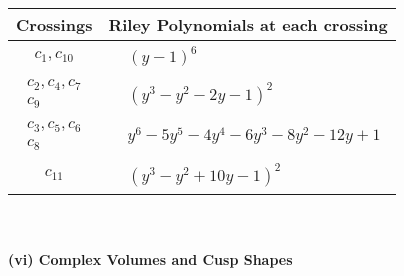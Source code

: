 \documentclass[1p]{elsarticle_modified}
\theoremstyle{definition}
\begin{document}
\begin{tabular}{m{50pt}|m{274pt}}
Crossings & \hspace{64pt}Riley Polynomials at each crossing \\
\hline $$\begin{aligned}c_{1},c_{10}\end{aligned}$$&$\begin{aligned}
&(y-1)^6
\end{aligned}$\\
\hline $$\begin{aligned}c_{2},c_{4},c_{7}\\c_{9}\end{aligned}$$&$\begin{aligned}
&(y^3- y^2-2 y-1)^2
\end{aligned}$\\
\hline $$\begin{aligned}c_{3},c_{5},c_{6}\\c_{8}\end{aligned}$$&$\begin{aligned}
&y^6-5 y^5-4 y^4-6 y^3-8 y^2-12 y+1
\end{aligned}$\\
\hline $$\begin{aligned}c_{11}\end{aligned}$$&$\begin{aligned}
&(y^3- y^2+10 y-1)^2
\end{aligned}$\\
\hline
\end{tabular}\\~\\
\newpage\flushleft \textbf{(vi) Complex Volumes and Cusp Shapes}
\end{document}
